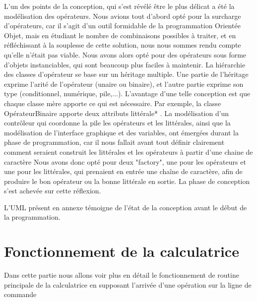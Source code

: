 L'un des points de la conception, qui s'est révélé être le plus délicat a été la modélisation des opérateurs. Nous avions tout d'abord opté pour la surcharge d'opérateurs, car il s'agit d'un outil formidable de la programmation Orientée Objet, mais en étudiant le nombre de combinaisons possibles à traiter, et en réfléchissant à la souplesse de cette solution, nous nous sommes rendu compte qu'elle n'était pas viable. Nous avons alors opté pour des opérateurs sous forme d'objets instanciables, qui sont beaucoup plus faciles à maintenir.
La hiérarchie des classes d'opérateur se base sur un héritage multiple. Une partie de l'héritage exprime l'arité de l'opérateur (unaire ou binaire), et l'autre partie exprime son type (conditionnel, numérique, pile,...). L'avantage d'une telle conception est que chaque classe mère apporte ce qui est nécessaire.
Par exemple, la classe OpérateurBinaire apporte deux attributs littérale* . 
\newline \newline
La modélisation d'un contrôleur qui coordonne la pile les opérateurs et les littérales, ainsi que la modélisation de l'interface graphique et des variables, ont émergées durant la phase de programmation, car il nous fallait avant tout définir clairement comment seraient construit les littérales et les opérateurs à partir d'une chaine de caractère
\newline \newline
Nous avons donc opté pour deux "factory", une pour les opérateurs et une pour les littérales, qui prenaient en entrée une chaîne de caractère, afin de produire le bon opérateur ou la bonne littérale en sortie.
\newline \newline
La phase de conception s'est achevée sur cette réflexion.

L'UML présent en annexe témoigne de l'état de la conception avant le début de la programmation.

\chapter{Fonctionnement de la calculatrice}
Dans cette partie nous allons voir plus en détail le fonctionnement de routine principale de la calculatrice en supposant l'arrivée d'une opération sur la ligne de commande

